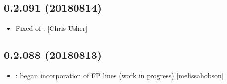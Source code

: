 \documentclass[a4paper,10pt,english]{report}
\begin{document}
\subsection{0.2.091 (2018\sphinxhyphen{}08\sphinxhyphen{}14)}
\label{\detokenize{misc/changelog:id391}}\begin{itemize}
\item {} 
Fixed  of . {[}Chris Usher{]}

\end{itemize}


\subsection{0.2.088 (2018\sphinxhyphen{}08\sphinxhyphen{}13)}
\label{\detokenize{misc/changelog:id392}}\begin{itemize}
\item {} 
: began incorporation of FP lines (work in
progress) {[}melissa\sphinxhyphen{}hobson{]}

\end{itemize}
\end{document}
